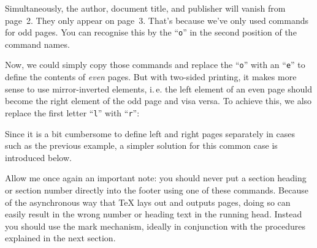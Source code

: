 \begin{Example}
  Simultaneously, the author, document title, and publisher will vanish from
  page~2. They only appear on page~3. That's because we've only used
  commands for odd pages. You can recognise this by the ``\texttt{o}'' in the
  second position of the command names.

  Now, we could simply copy those commands and replace the ``\texttt{o}'' with
  an ``\texttt{e}'' to define the contents of \emph{even} pages. But with
  two-sided printing, it makes more sense to use mirror-inverted elements,
  i.\,e. the left element of an even page should become the right element of
  the odd page and visa versa. To achieve this, we also replace the first
  letter ``\texttt{l}'' with ``\texttt{r}'':
\end{Example}
%
Since it is a bit cumbersome to define left and right pages separately in
cases such as the previous example, a simpler solution for this common case is
introduced below.

Allow me once again an important note: you should
never put a section heading or section number directly into the footer using
one of these commands. Because of the asynchronous way that \TeX{} lays out and
outputs pages, doing so can easily result in the wrong number or heading text
in the running head. Instead you should use the mark mechanism, ideally in
conjunction with the procedures explained in the next section.%
\EndIndexGroup


